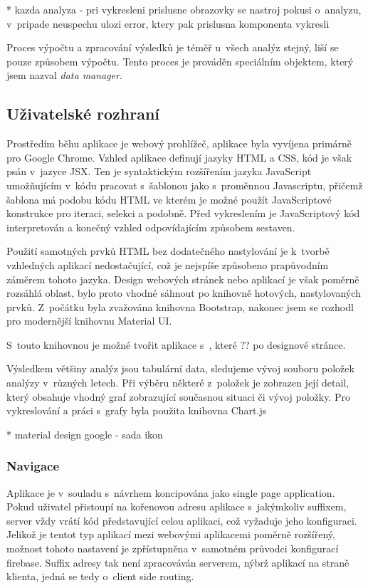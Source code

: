 * kazda analyza - pri vykresleni prislusne obrazovky se nastroj pokusi o~analyzu, v~pripade neuspechu ulozi error, ktery pak prislusna komponenta vykresli

Proces výpočtu a zpracování výsledků je téměř u~všech analýz stejný, liší se pouze způsobem výpočtu. Tento proces je prováděn speciálním objektem, který jsem nazval \textit{data manager}.

\subsection{Uživatelské rozhraní}

Prostředím běhu aplikace je webový prohlížeč, aplikace byla vyvíjena primárně pro Google Chrome. Vzhled aplikace definují jazyky HTML a CSS, kód je však psán v~jazyce JSX. Ten je syntaktickým rozšířením jazyka JavaScript umožňujícím v~kódu pracovat s~šablonou jako s~proměnnou Javascriptu, přičemž šablona má podobu kódu HTML ve kterém je možné použít JavaScriptové konstrukce pro iteraci, selekci a podobně. Před vykreslením je JavaScriptový kód interpretován a konečný vzhled odpovídajícím způsobem sestaven.

Použití samotných prvků HTML bez dodatečného nastylování je k~tvorbě vzhledných aplikací nedostačující, což je nejspíše způsobeno prapůvodním záměrem tohoto jazyka. Design webových stránek nebo aplikací je však poměrně rozsáhlá oblast, bylo proto vhodné sáhnout po knihovně hotových, nastylovaných prvků. Z~počátku byla zvažována knihovna Bootstrap, nakonec jsem se rozhodl pro modernější knihovnu Material UI.

S~touto knihovnou je možné tvořit aplikace s~, které ?? po designové stránce.

Výsledkem většiny analýz jsou tabulární data, sledujeme vývoj souboru položek analýzy v~různých letech. Při výběru některé z~položek je zobrazen její detail, který obsahuje vhodný graf zobrazující současnou situaci či vývoj položky. Pro vykreslování a práci s~grafy byla použita knihovna Chart.js


* material design google - sada ikon

\subsubsection{Navigace}
Aplikace je v~souladu s~návrhem koncipována jako single page application. Pokud uživatel přistoupí na kořenovou adresu aplikace s~jakýmkoliv suffixem, server vždy vrátí kód představující celou aplikaci, což vyžaduje jeho konfiguraci. Jelikož je tentot typ aplikací mezi webovými aplikacemi poměrně rozšířený, možnost tohoto nastavení je zpřístupněna v~samotném průvodci konfigurací firebase. Suffix adresy tak není zpracováván serverem, nýbrž aplikací na straně klienta, jedná se tedy o~client side routing.



